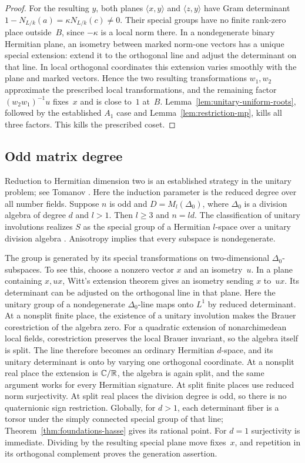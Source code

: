 \begin{proof}
For the resulting $y$, both planes $\langle x,y\rangle$ and
$\langle z,y\rangle$ have Gram determinant
$1-N_{L/k}(a)=\kappa N_{L/k}(c)\ne0$.  Their special groups have no
finite rank-zero place outside~$B$, since $-\kappa$ is a local norm
there.  In a nondegenerate binary Hermitian plane, an isometry between
marked norm-one vectors has a unique special extension: extend it to
the orthogonal line and adjust the determinant on that line.  In
local orthogonal coordinates this extension varies smoothly with the
plane and marked vectors.  Hence the two resulting transformations
$w_1,w_2$ approximate the prescribed local transformations, and the
remaining factor $(w_2w_1)^{-1}u$ fixes~$x$ and is close to~$1$ at~$B$.
Lemma~\ref{lem:unitary-uniform-roots}, followed by the established
$A_1$ case and Lemma~\ref{lem:restriction-mp}, kills all three factors.
This kills the prescribed coset.
\end{proof}

\subsection{Odd matrix degree}

Reduction to Hermitian dimension two is an established strategy in the
unitary problem; see Tomanov \cite[p.~895]{Tomanov1992}.
Here the induction parameter is the reduced degree over all number fields.
Suppose $n$ is odd and $D=M_l(\Delta_0)$, where $\Delta_0$ is a division
algebra of degree $d$ and $l>1$.  Then $l\geq3$ and $n=ld$.  The
classification of unitary involutions realizes $S$ as the special
group of a Hermitian $l$-space over a unitary division algebra
\cite[Theorem~4.2(2)]{KMRT}.  Anisotropy implies that every subspace is nondegenerate.

The group is generated by its special transformations on
two-dimensional $\Delta_0$-subspaces.  To see this, choose a nonzero
vector $x$ and an isometry~$u$.  In a plane containing $x,ux$, Witt's
extension theorem gives an isometry sending $x$ to~$ux$.  Its
determinant can be adjusted on the orthogonal line in that plane.
Here the unitary group of a nondegenerate $\Delta_0$-line maps onto
$L^1$ by reduced determinant.  At a nonsplit finite place, the
existence of a unitary involution makes the Brauer corestriction of
the algebra zero.  For a quadratic extension of nonarchimedean local
fields, corestriction preserves the local Brauer invariant, so the
algebra itself is split.  The line therefore becomes an ordinary
Hermitian $d$-space, and its unitary determinant is onto by varying
one orthogonal coordinate.  At a nonsplit real place the extension
is $\mathbb C/\mathbb R$, the algebra is again split, and the same argument
works for every Hermitian signature.  At split finite places use
reduced norm surjectivity.  At split real places the division degree is
odd, so there is no quaternionic sign restriction.  Globally, for
$d>1$, each determinant fiber is a torsor under the simply connected
special group of that line; Theorem~\ref{thm:foundations-hasse} gives
its rational point.  For $d=1$ surjectivity is immediate.  Dividing by the resulting
special plane move fixes~$x$, and repetition in its orthogonal
complement proves the generation assertion.

